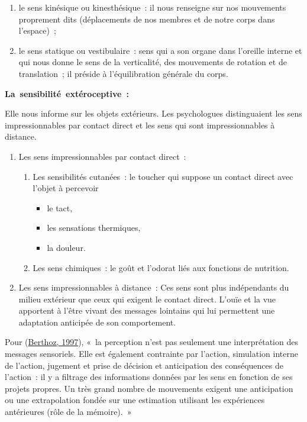 \documentclass[
]{book}
\providecommand{\tightlist}{%
  \setlength{\itemsep}{0pt}\setlength{\parskip}{0pt}}
\begin{document}
\begin{enumerate}
\def\labelenumi{\arabic{enumi}.}
\tightlist
\item
  le sens kinésique ou kinesthésique~: il nous
  renseigne sur nos mouvements proprement dits (déplacements de nos
  membres et de notre corps dans l'espace)~;
\item
  le sens statique ou vestibulaire~: sens qui a
  son organe dans l'oreille interne et qui nous donne le sens de la
  verticalité, des mouvements de rotation et de translation~; il préside à
  l'équilibration générale du corps.
\end{enumerate}

\textbf{La~sensibilité~extéroceptive~:}

Elle nous informe sur les objets extérieurs. Les psychologues
distinguaient les sens impressionnables par contact direct et les sens
qui sont impressionnables à distance.

\begin{enumerate}
\def\labelenumi{\arabic{enumi}.}
\tightlist
\item
  Les sens impressionnables par contact direct~:

  \begin{enumerate}
  \def\labelenumii{\arabic{enumii}.}
  \tightlist
  \item
    Les sensibilités cutanées~: le toucher qui
    suppose un contact direct avec l'objet à percevoir

    \begin{itemize}
    \tightlist
    \item
      le tact,
    \item
      les sensations thermiques,
    \item
      la douleur.
    \end{itemize}
  \item
    Les sens chimiques~: le goût et l'odorat
    liés aux fonctions de nutrition.
  \end{enumerate}
\item
  Les sens impressionnables à distance~: Ces sens
  sont plus indépendants du milieu extérieur que ceux qui exigent le
  contact direct. L'ouïe et la vue apportent à l'être vivant des messages
  lointains qui lui permettent une adaptation anticipée de son
  comportement.
\end{enumerate}

Pour (\protect\hyperlink{ref-berthoz1997sens}{Berthoz, 1997}), «~la
perception n'est pas seulement une interprétation des messages sensoriels.
Elle est également contrainte par l'action, simulation interne de l'action,
jugement et prise de décision et anticipation des conséquences de l'action~:
il y a filtrage des informations données par les sens en fonction de ses
projets propres. Un très grand nombre de mouvements exigent une anticipation
ou une extrapolation fondée sur une estimation utilisant les expériences
antérieures (rôle de la mémoire).~»
\end{document}
